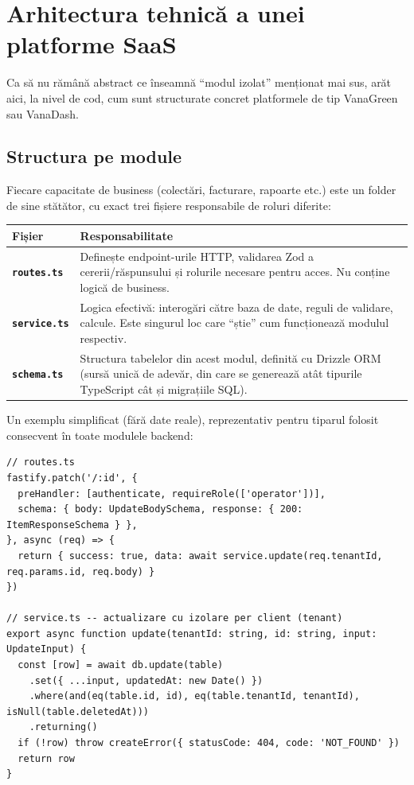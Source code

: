 \documentclass[11pt, a4paper]{article}
\begin{document}

\section{Arhitectura tehnică a unei platforme SaaS}

Ca să nu rămână abstract ce înseamnă ``modul izolat'' menționat mai sus, arăt aici, la nivel de
cod, cum sunt structurate concret platformele de tip VanaGreen sau VanaDash.

\subsection{Structura pe module}

Fiecare capacitate de business (colectări, facturare, rapoarte etc.) este un folder de sine
stătător, cu exact trei fișiere responsabile de roluri diferite:

\renewcommand{\arraystretch}{1.3}
\begin{tabularx}{\textwidth}{>{\bfseries}l X}
\toprule
Fișier & Responsabilitate \\
\midrule
\texttt{routes.ts} & Definește endpoint-urile HTTP, validarea Zod a cererii/răspunsului și
rolurile necesare pentru acces. Nu conține logică de business. \\
\texttt{service.ts} & Logica efectivă: interogări către baza de date, reguli de validare,
calcule. Este singurul loc care ``știe'' cum funcționează modulul respectiv. \\
\texttt{schema.ts} & Structura tabelelor din acest modul, definită cu Drizzle ORM (sursă unică
de adevăr, din care se generează atât tipurile TypeScript cât și migrațiile SQL). \\
\bottomrule
\end{tabularx}

\vspace{0.8em}
\noindent Un exemplu simplificat (fără date reale), reprezentativ pentru tiparul folosit
consecvent în toate modulele backend:

\begingroup\small
\begin{verbatim}
// routes.ts
fastify.patch('/:id', {
  preHandler: [authenticate, requireRole(['operator'])],
  schema: { body: UpdateBodySchema, response: { 200: ItemResponseSchema } },
}, async (req) => {
  return { success: true, data: await service.update(req.tenantId, req.params.id, req.body) }
})

// service.ts -- actualizare cu izolare per client (tenant)
export async function update(tenantId: string, id: string, input: UpdateInput) {
  const [row] = await db.update(table)
    .set({ ...input, updatedAt: new Date() })
    .where(and(eq(table.id, id), eq(table.tenantId, tenantId), isNull(table.deletedAt)))
    .returning()
  if (!row) throw createError({ statusCode: 404, code: 'NOT_FOUND' })
  return row
}
\end{verbatim}
\endgroup
\end{document}
